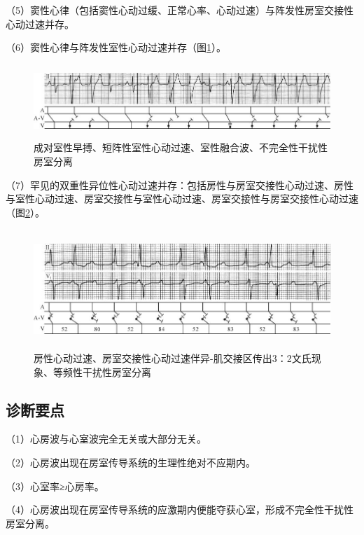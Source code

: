 （5）窦性心律（包括窦性心动过缓、正常心率、心动过速）与阵发性房室交接性心动过速并存。

（6）窦性心律与阵发性室性心动过速并存（图\ref{fig26-13}）。

\begin{figure}[!htbp]
 \centering
 \includegraphics[width=5.80208in,height=1.09375in]{./images/Image00454.jpg}
 \captionsetup{justification=centering}
 \caption{成对室性早搏、短阵性室性心动过速、室性融合波、不完全性干扰性房室分离}
 \label{fig26-13}
  \end{figure} 

（7）罕见的双重性异位性心动过速并存：包括房性与房室交接性心动过速、房性与室性心动过速、房室交接性与室性心动过速、房室交接性与房室交接性心动过速（图\ref{fig26-14}）。

\begin{figure}[!htbp]
 \centering
 \includegraphics[width=5.79167in,height=1.77083in]{./images/Image00455.jpg}
 \captionsetup{justification=centering}
 \caption{房性心动过速、房室交接性心动过速伴异-肌交接区传出3：2文氏现象、等频性干扰性房室分离}
 \label{fig26-14}
  \end{figure} 

\protect\hypertarget{text00033.htmlux5cux23subid406}{}{}

\subsection{诊断要点}

（1）心房波与心室波完全无关或大部分无关。

（2）心房波出现在房室传导系统的生理性绝对不应期内。

（3）心室率≥心房率。

（4）心房波出现在房室传导系统的应激期内便能夺获心室，形成不完全性干扰性房室分离。

